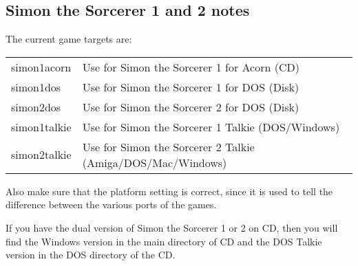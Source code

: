 \subsection{Simon the Sorcerer 1 and 2 notes}
The current game targets are:

\begin{tabular}{ll}
 simon1acorn  & Use for Simon the Sorcerer 1 for Acorn (CD)\\
 simon1dos    & Use for Simon the Sorcerer 1 for DOS (Disk)\\
 simon2dos    & Use for Simon the Sorcerer 2 for DOS (Disk)\\
 simon1talkie & Use for Simon the Sorcerer 1 Talkie (DOS/Windows)\\
 simon2talkie & Use for Simon the Sorcerer 2 Talkie (Amiga/DOS/Mac/Windows)\\
\end{tabular}

Also make sure that the platform setting is correct, since it is used
to tell the difference between the various ports of the games.

If you have the dual version of Simon the Sorcerer 1 or 2 on CD,
then you will find the Windows version in the main directory of CD
and the DOS Talkie version in the DOS directory of the CD.
